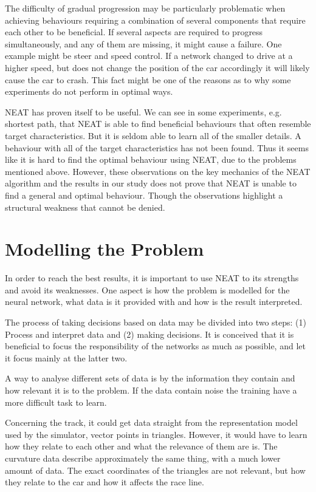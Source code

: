 The difficulty of gradual progression may be particularly problematic when achieving behaviours requiring a combination of several components that require each other to be beneficial. If several aspects are required to progress simultaneously, and any of them are missing, it might cause a failure. One example might be steer and speed control. If a network changed to drive at a higher speed, but does not change the position of the car accordingly it will likely cause the car to crash. This fact might be one of the reasons as to why some experiments do not perform in optimal ways.

NEAT has proven itself to be useful. We can see in some experiments, e.g. shortest path, that NEAT is able to find beneficial behaviours that often resemble target characteristics. But it is seldom able to learn all of the smaller details. A behaviour with all of the target characteristics has not been found. Thus it seems like it is hard to find the optimal behaviour using NEAT, due to the problems mentioned above. However, these observations on the key mechanics of the NEAT algorithm and the results in our study does not prove that NEAT is unable to find a general and optimal behaviour. Though the observations highlight a structural weakness that cannot be denied. 

\section{Modelling the Problem}

In order to reach the best results, it is important to use NEAT to its strengths and avoid its weaknesses. One aspect is how the problem is modelled for the neural network, what data is it provided with and how is the result interpreted.

The process of taking decisions based on data may be divided into two steps: (1) Process and interpret data and (2) making decisions. It is conceived that it is beneficial to focus the responsibility of the networks as much as possible, and let it focus mainly at the latter two. 


A way to analyse different sets of data is by the information they contain and how relevant it is to the problem. If the data contain noise the training have a more difficult task to learn.

Concerning the track, it could get data straight from the representation model used by the simulator, vector points in triangles. However, it would have to learn how they relate to each other and what the relevance of them are is. The curvature data describe approximately the same thing, with a much lower amount of data. The exact coordinates of the triangles are not relevant, but how they relate to the car and how it affects the race line. 

